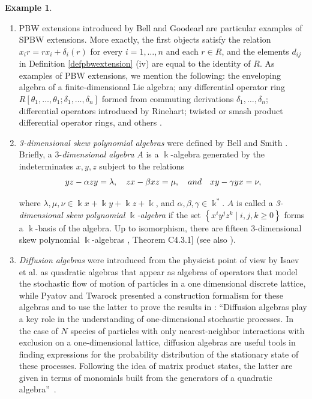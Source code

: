 \documentclass{amsart}
\theoremstyle{definition}
\newtheorem{example}[theorem]{Example}
\theoremstyle{remark}
\numberwithin{equation}{section}
\begin{document}
\begin{example}
\begin{enumerate}
\item [\rm (iii)] PBW extensions introduced by Bell and Goodearl \cite{BellGoodearl1988} are particular examples of SPBW extensions. More exactly, the first objects satisfy the relation $x_ir = rx_i + \delta_i(r)$ for every $i = 1,\dotsc, n$ and each $r\in R$, and the elements $d_{ij}$ in Definition \ref{defpbwextension}  (iv) are equal to the identity of $R$. As examples of PBW extensions, we mention the following:  the enveloping algebra of a finite-dimensional Lie algebra; any differential operator ring $R[\theta_1,\dotsc, \theta_1;\delta_1,\dotsc, \delta_n]$ formed from commuting derivations $\delta_1,\dotsc, \delta_n$; differential operators introduced by Rinehart; twisted or smash product differential operator rings, and others \cite[p. 27]{BellGoodearl1988}. 

\item [\rm (iv)] {\em 3-dimensional skew polynomial algebras} were defined by Bell and Smith \cite{BellSmith1990}. Briefly, a $3$-{\em dimensional algebra} $A$ is a $\Bbbk$-algebra generated by the indeterminates $x, y, z$ subject to the relations 
\[
yz-\alpha zy = \lambda, \quad zx - \beta xz = \mu, \quad {\rm and} \quad xy - \gamma yx = \nu, 
\]

where $\lambda,\mu,\nu \in \Bbbk x+\Bbbk y+\Bbbk z+\Bbbk$, and $\alpha, \beta, \gamma \in \Bbbk^{*}$. $A$ is called a \textit{3-dimensional skew polynomial $\Bbbk$-algebra} if the set $\left\{x^iy^jz^k\mid i,j,k\geq 0\right\}$ forms a $\Bbbk$-basis of the algebra. Up to isomorphism, there are fifteen 3-dimensional skew polynomial $\Bbbk$-algebras \cite{Rosenberg1995}, Theorem C4.3.1] (see also \cite{RedmanPhDThesis1996, Redman1999, ReyesSuarez20173D}).

\item [\rm (v)] {\em Diffusion algebras} were introduced from the physicist point of view by Isaev et al. \cite{IsaevPyatovRittenberg2001} as quadratic algebras that appear as algebras of operators that model the stochastic flow of motion of particles in a one dimensional discrete lattice, while Pyatov and Twarock \cite{PyatovTwarock2002} presented a construction formalism for these algebras and to use the latter to prove the results in \cite{IsaevPyatovRittenberg2001}: \textquotedblleft Diffusion algebras play a key role in the understanding of one-dimensional stochastic processes. In the case of $N$ species of particles with only nearest-neighbor interactions with exclusion on a one-dimensional lattice, diffusion algebras are useful tools in finding expressions for the probability distribution of the stationary state of these processes. Following the idea of matrix product states, the latter are given in terms of monomials built from the generators of a quadratic algebra\textquotedblright\ \cite[p. 3268]{PyatovTwarock2002}.


\end{enumerate}
\end{example}
\end{document}
